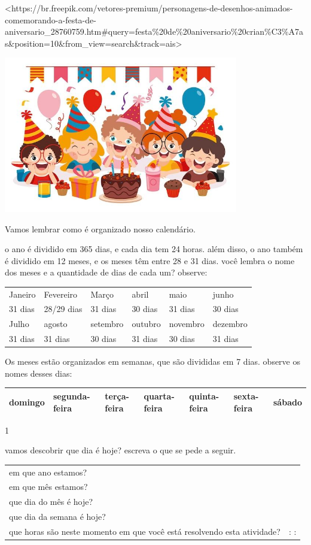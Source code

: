 \textless{}https://br.freepik.com/vetores-premium/personagens-de-desenhos-animados-comemorando-a-festa-de-aniversario\_28760759.htm\#query=festa\%20de\%20aniversario\%20crian\%C3\%A7as\&position=10\&from\_view=search\&track=ais\textgreater{}

\includegraphics[width=4.02731in,height=2.68282in]{media/image34.jpg}

Vamos lembrar como é organizado nosso calendário.

o ano é dividido em 365 dias, e cada dia tem 24 horas. além disso, o ano
também é dividido em 12 meses, e os meses têm entre 28 e 31 dias. você lembra o nome dos meses e a quantidade
de dias de cada um? observe:

\begin{longtable}[]{@{}llllll@{}}
\toprule
Janeiro & Fevereiro & Março & abril & maio & junho\tabularnewline
31 dias & 28/29 dias & 31 dias & 30 dias & 31 dias & 30 dias\tabularnewline
Julho & agosto & setembro & outubro & novembro & dezembro\tabularnewline
31 dias & 31 dias & 30 dias & 31 dias & 30 dias & 31 dias\tabularnewline
\bottomrule
\end{longtable}

Os meses estão organizados em semanas, que são divididas em 7 dias. observe os nomes
desses dias:

\begin{longtable}[]{@{}lllllll@{}}
\toprule
domingo & segunda-feira & terça-feira & quarta-feira & quinta-feira & sexta-feira &
sábado\tabularnewline
\bottomrule
\end{longtable}


\num{1}

vamos descobrir que dia é hoje? escreva o que se pede a seguir.

\begin{longtable}[]{@{}ll@{}}
\toprule
em que ano estamos? &\tabularnewline
em que mês estamos? &\tabularnewline
que dia do mês é hoje? &\tabularnewline
que dia da semana é hoje? &\tabularnewline
que horas são neste momento em que você está resolvendo esta atividade? & : :\tabularnewline
\bottomrule
\end{longtable}

